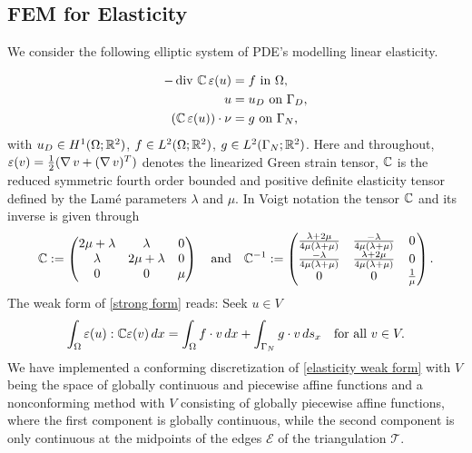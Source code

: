 \subsection{FEM for Elasticity}

We consider the following elliptic system of PDE's modelling linear elasticity.

\begin{align}
\label{strong form}
-\operatorname{div}\, \mathbb{C}\,\varepsilon(u)&=f \text{  in }\Omega,\\
u&=u_D\text{ on }\Gamma_D, \\
(\mathbb{C}\,\varepsilon(u))\cdot \nu&=g \text{ on }\Gamma_N,
\end{align}
with $u_D\in H^1(\Omega;\mathbb{R}^2)$, $f\in L^2(\Omega;\mathbb{R}^2)$, $g\in
L^2(\Gamma_N;\mathbb{R}^2)$. Here and throughout,
$\varepsilon(v)=\frac{1}{2}(\operatorname{\nabla} v+(\operatorname{\nabla} v)^T)$ denotes the
linearized Green strain tensor, $\mathbb{C}$ is the reduced symmetric fourth order
bounded and positive definite elasticity tensor defined by the
Lam\'e parameters $\lambda$ and $\mu$. In Voigt notation the tensor $\mathbb{C}$ and its inverse is given through
\begin{equation*}
\mathbb{C}:=\begin{pmatrix}
2\mu+\lambda & \lambda       & 0\\
\lambda      & 2\mu+\lambda  & 0\\
0            & 0             & \mu
\end{pmatrix} \quad\text{and}\quad
\mathbb{C}^{-1}:=\begin{pmatrix}
\frac{\lambda+2 \mu}{4\mu(\lambda+\mu)} & \frac{-\lambda}{4\mu(\lambda+\mu)}            & 0\\
\frac{-\lambda}{4\mu(\lambda+\mu)}          & \frac{\lambda+2 \mu}{4\mu(\lambda+\mu)} & 0\\
0 & 0 & \frac{1}{\mu}
\end{pmatrix}.
\end{equation*}
The weak form of \eqref{strong form} reads:
Seek $u\in V$
\begin{equation}\label{elasticity weak form}
\int_{\Omega} \varepsilon(u):\mathbb{C}\varepsilon(v) \, dx = \int_{\Omega}
f \cdot v \, dx + \int_{\Gamma_N} g\cdot v \, ds_x \quad\text{for
all } v \in V.
\end{equation}
We have implemented a conforming discretization of \eqref{elasticity
weak form} with $V$ being the space of globally continuous and
piecewise affine functions and a nonconforming method with $V$
consisting of globally piecewise affine functions, where the first
component is globally continuous, while the second component is only
continuous at the midpoints of the edges $\mathcal{E}$ of the
triangulation $\mathcal{T}$.
\medskip

